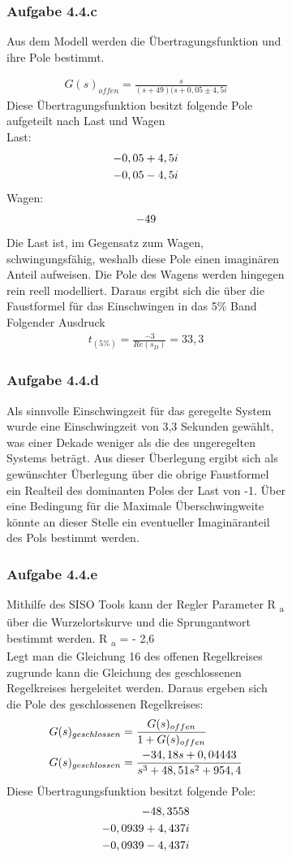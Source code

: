 \documentclass[10pt]{scrartcl}
\begin{document}
\begin{figure}[H]
\begin{figure}
\subsubsection{Aufgabe 4.4.c}	
Aus dem Modell werden die Übertragungsfunktion und ihre Pole bestimmt.

\begin{align}
   G(s)_{offen}=\frac{s}{(s+49)(s+0,05\pm4,5i}
\end{align}
Diese Übertragungsfunktion besitzt folgende Pole aufgeteilt nach Last und Wagen\\ 
Last: 
\begin{align}
-0,05+4,5i  \notag \\
-0,05-4,5i  \notag 
\end{align}
Wagen:
\begin{align}
-49  \notag 
\end{align}
Die Last ist, im Gegensatz zum Wagen, schwingungsfähig, weshalb diese Pole einen imaginären Anteil aufweisen. Die Pole des Wagens werden hingegen rein reell modelliert. 
Daraus ergibt sich die über die Faustformel für das Einschwingen in das 5\% Band Folgender Ausdruck
\begin{align}
t_{(5\%)}=\frac{-3}{Re(s_D)}=33,3
\end{align}
\subsubsection{Aufgabe 4.4.d}	
 Als sinnvolle Einschwingzeit für das geregelte System wurde eine Einschwingzeit von  3,3 Sekunden gewählt, was einer Dekade weniger als die des ungeregelten Systems beträgt. Aus dieser Überlegung ergibt sich als gewünschter Überlegung über die obrige Faustformel ein Realteil des dominanten Poles der Last von -1. Über eine Bedingung für die Maximale Überschwingweite könnte an dieser Stelle ein eventueller Imaginäranteil des Pols bestimmt werden.\\ 
\subsubsection{Aufgabe 4.4.e}	
Mithilfe des SISO Tools kann der Regler Parameter R \textsubscript{a}
über die Wurzelortskurve und die Sprungantwort bestimmt werden.
R \textsubscript{a} = - 2,6 \\
Legt man die Gleichung 16 des offenen Regelkreises zugrunde kann die Gleichung des geschlossenen Regelkreises hergeleitet werden.
Daraus ergeben sich die Pole des geschlossenen Regelkreises:
\begin{align}
G(s)_{geschlossen} &=\frac{G(s)_{offen}}{1+G(s)_{offen}} \notag\\
G(s)_{geschlossen}&=\frac{-34,18s+0,04443}{s^3+48,51s^2+954,4}
\end{align}
Diese Übertragungsfunktion besitzt folgende Pole:
\begin{align}
-48,3558 \notag \\
-0,0939+4,437i  \notag \\
-0,0939-4,437i \notag 
 \end{align} \\

\end{figure}
\end{figure}
\end{document}
